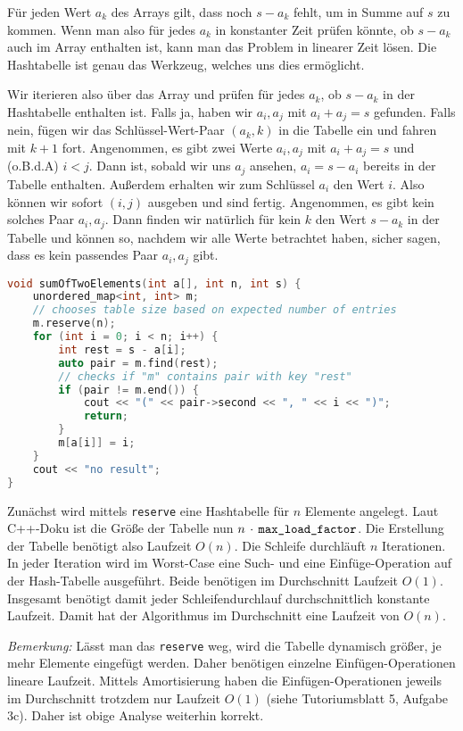 \documentclass[11pt,a4paper]{article}
\begin{document}
\begin{loesung}
    Für jeden Wert $a_k$ des Arrays gilt, dass noch $s - a_k$ fehlt, um in Summe auf $s$ zu kommen.
    Wenn man also für jedes $a_k$ in konstanter Zeit prüfen könnte, ob $s - a_k$ auch im Array enthalten ist, kann man das Problem in linearer Zeit lösen.
    Die Hashtabelle ist genau das Werkzeug, welches uns dies ermöglicht.

    Wir iterieren also über das Array und prüfen für jedes $a_k$, ob $s - a_k$ in der Hashtabelle enthalten ist.
    Falls ja, haben wir $a_i, a_j$ mit $a_i + a_j = s$ gefunden.
    Falls nein, fügen wir das Schlüssel-Wert-Paar $(a_k, k)$ in die Tabelle ein und fahren mit $k + 1$ fort.
    Angenommen, es gibt zwei Werte $a_i, a_j$ mit $a_i + a_j = s$ und (o.B.d.A) $i < j$.
    Dann ist, sobald wir uns $a_j$ ansehen, $a_i = s - a_i$ bereits in der Tabelle enthalten.
    Außerdem erhalten wir zum Schlüssel $a_i$ den Wert $i$.
    Also können wir sofort $(i, j)$ ausgeben und sind fertig.
    Angenommen, es gibt kein solches Paar $a_i, a_j$.
    Dann finden wir natürlich für kein $k$ den Wert $s - a_k$ in der Tabelle und können so, nachdem wir alle Werte betrachtet haben, sicher sagen, dass es kein passendes Paar $a_i, a_j$ gibt.
    \begin{lstlisting}[language=c++]
void sumOfTwoElements(int a[], int n, int s) {
    unordered_map<int, int> m;
    // chooses table size based on expected number of entries
    m.reserve(n);
    for (int i = 0; i < n; i++) {
        int rest = s - a[i];
        auto pair = m.find(rest);
        // checks if "m" contains pair with key "rest"
        if (pair != m.end()) {
            cout << "(" << pair->second << ", " << i << ")";
            return;
        }
        m[a[i]] = i;
    }
    cout << "no result";
}
    \end{lstlisting}
    
    Zunächst wird mittels \texttt{reserve} eine Hashtabelle für $n$ Elemente angelegt.
    Laut C++-Doku ist die Größe der Tabelle nun $n \,\cdot \,\text{\texttt{max\_load\_factor}}$.
    Die Erstellung der Tabelle benötigt also Laufzeit $O(n)$.
    Die Schleife durchläuft $n$ Iterationen.
    In jeder Iteration wird im Worst-Case eine Such- und eine Einfüge-Operation auf der Hash-Tabelle ausgeführt.
    Beide benötigen im Durchschnitt Laufzeit $O(1)$.
    Insgesamt benötigt damit jeder Schleifendurchlauf durchschnittlich konstante Laufzeit.
    Damit hat der Algorithmus im Durchschnitt eine Laufzeit von $O(n)$.

    \emph{Bemerkung:} Lässt man das \texttt{reserve} weg, wird die Tabelle dynamisch größer, je mehr Elemente eingefügt werden.
    Daher benötigen einzelne Einfügen-Operationen lineare Laufzeit.
    Mittels Amortisierung haben die Einfügen-Operationen jeweils im Durchschnitt trotzdem nur Laufzeit $O(1)$ (siehe Tutoriumsblatt 5, Aufgabe 3c).
    Daher ist obige Analyse weiterhin korrekt.
\end{loesung}
\end{document}
